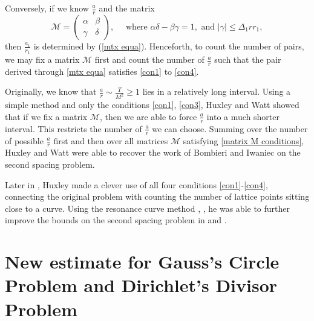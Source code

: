 \documentclass[11pt]{amsart}
\numberwithin{equation}{section}
\theoremstyle{definition}
\theoremstyle{proposition}
\begin{document}
Conversely, if we know $\frac{a}{r}$ and the matrix
\begin{equation}   \label{matrix M conditions}
\mathcal{M}=\begin{pmatrix}
\alpha & \beta \\
\gamma & \delta
\end{pmatrix}, \quad \text{ where }\alpha\delta-\beta\gamma=1, \text{ and }  |\gamma|\le \Delta_1 rr_1,    
\end{equation}
then $\frac{a_1}{r_1}$ is determined by (\ref{mtx equa}). Henceforth,  to count the number of pairs, we may fix a matrix $\mathcal{M}$ first and count the number of $\frac{a}{r}$ such that  the pair derived through \eqref{mtx equa} satisfies \eqref{con1} to \eqref{con4}. 

Originally, we know that $\frac{a}{r} \sim \frac{T}{M^2}\ge 1$ lies in a relatively long interval. Using a simple method and  only the conditions \eqref{con1}, \eqref{con3}, Huxley and Watt \cite[Section 2]{HuxleyZeta1} showed that if we fix a matrix $\mathcal{M}$, then we are able to force $\frac{a}{r}$ into a much shorter interval. This restricts the number of $\frac{a}{r}$ we can choose. Summing over the number of possible $\frac{a}{r}$ first and then over all matrices $\mathcal{M}$ satisfying \eqref{matrix M conditions}, Huxley and Watt were able to recover the work of Bombieri and Iwaniec on the second spacing problem.

Later in \cite{HuxleyZeta4}, Huxley made a clever use of all four conditions \eqref{con1}-\eqref{con4}, connecting the original problem with counting the number of lattice points sitting close to a curve. Using the resonance curve method \cite{Huxley1996}, \cite{HuxleyRC}, he was able to further improve the bounds on the second spacing problem in \cite{HuxleyZeta5} and \cite{Huxley03}.  


\section{ New estimate for Gauss's Circle Problem and Dirichlet's Divisor Problem }  \label{final argument}
\end{document}
